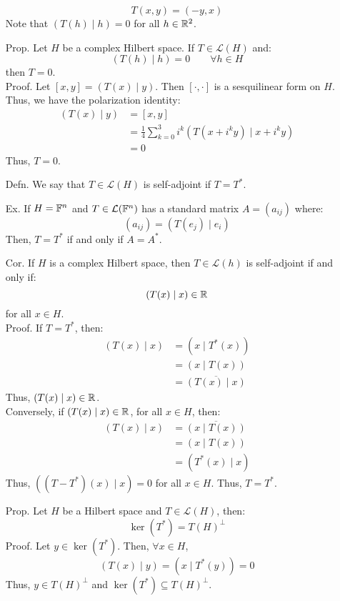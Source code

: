 \documentclass[12pt]{article}
\begin{document}
\begin{itemize}
    \[ T(x,y) = (-y, x)\]
    Note that $(T(h) \mid h) = 0$ for all $h \in \mathbb R^2$.
    \item[Prop.] Let $H$ be a complex Hilbert space. If $T \in \mathcal{L}(H)$ and: 
    \[ (T(h) \mid h) = 0 \qquad \forall h \in H\]
    then $T = 0$. \\
    Proof. Let $[x, y] = (T(x) \mid y)$. Then $[\cdot, \cdot]$ is a sesquilinear form on $H$. \\ 
    Thus, we have the polarization identity: 
    \begin{align*}
        (T(x) \mid y) &= [x, y] \\
        &= \frac 14 \sum_{k=0}^3 i^k (T(x + i^k y) \mid x + i^k y) \\
        &= 0
    \end{align*}
    Thus, $T = 0$. 
    \item[Defn.] We say that $T \in \mathcal{L}(H)$ is self-adjoint if $T = T^*$.
    \item[Ex.] If $H = \mathbb F^n$ and $T \in \mathcal L(\mathbb F^n)$ has a standard matrix $A = (a_{ij})$ where: 
    \[ (a_{ij}) = (T(e_j) \mid e_i)\]
    Then, $T = T^*$ if and only if $A = A^*$.
    \item[Cor.] If $H$ is a complex Hilbert space, then $T \in \mathcal L(h)$ is self-adjoint if and only if: 
    \[ (T(x) \mid x) \in \mathbb R\]
    for all $x \in H$. \\
    Proof. If $T = T^*$, then: 
    \begin{align*}
        (T(x) \mid x) &= (x \mid T^*(x)) \\
        &= (x \mid T(x)) \\
        &= \overline{(T(x) \mid x)}
    \end{align*}
    Thus, $(T(x) \mid x) \in \mathbb R$. \\
    Conversely, if $(T(x) \mid x) \in \mathbb R$, for all $x \in H$, then:
    \begin{align*}
        (T(x) \mid x) &= \overline{(x \mid T(x))} \\
        &= (x \mid T(x)) \\
        &= (T^*(x) \mid x)
    \end{align*}
    Thus, $((T-T^*)(x) \mid x) = 0$ for all $x \in H$. Thus, $T = T^*$. 
    \item[Prop.] Let $H$ be a Hilbert space and $T \in \mathcal L(H)$, then: 
    \[ \ker(T^*) = T(H)^\perp\]
    Proof. Let $y \in \ker(T^*)$. Then, $\forall x \in H$, 
    \[(T(x) \mid y) = (x \mid T^*(y)) = 0\]
    Thus, $y \in T(H)^\perp$ and $\ker(T^*) \subseteq T(H)^\perp$. \\

\end{itemize}
\end{document}
